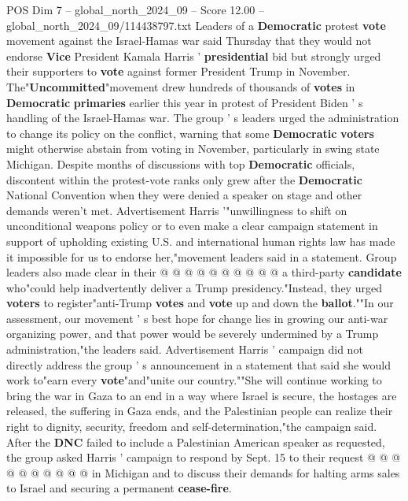 \begin{textsample}{POS Dim 7 – global\_north\_2024\_09 – Score 12.00 – global\_north\_2024\_09/114438797.txt}  \label{ex:f7_pos_078}
Leaders of a \textbf{Democratic} protest \textbf{vote} movement against the Israel-Hamas war said Thursday that they would not endorse \textbf{Vice} President Kamala Harris ' \textbf{presidential} bid but strongly urged their supporters to \textbf{vote} against former President Trump in November.
The"\textbf{Uncommitted}"movement drew hundreds of thousands of \textbf{votes} in \textbf{Democratic} \textbf{primaries} earlier this year in protest of President Biden ' s handling of the Israel-Hamas war.
The group ' s leaders urged the administration to change its policy on the conflict, warning that some \textbf{Democratic} \textbf{voters} might otherwise abstain from voting in November, particularly in swing state Michigan.
Despite months of discussions with top \textbf{Democratic} officials, discontent within the protest-vote ranks only grew after the \textbf{Democratic} National Convention when they were denied a speaker on stage and other demands weren't met.
Advertisement Harris '"unwillingness to shift on unconditional weapons policy or to even make a clear campaign statement in support of upholding existing U.S. and international human rights law has made it impossible for us to endorse her,"movement leaders said in a statement.
Group leaders also made clear in their @ @ @ @ @ @ @ @ @ @ a third-party \textbf{candidate} who"could help inadvertently deliver a Trump presidency."Instead, they urged \textbf{voters} to register"anti-Trump \textbf{votes} and \textbf{vote} up and down the \textbf{ballot}.""In our assessment, our movement ' s best hope for change lies in growing our anti-war organizing power, and that power would be severely undermined by a Trump administration,"the leaders said.
Advertisement Harris ' campaign did not directly address the group ' s announcement in a statement that said she would work to"earn every \textbf{vote}"and"unite our country.""She will continue working to bring the war in Gaza to an end in a way where Israel is secure, the hostages are released, the suffering in Gaza ends, and the Palestinian people can realize their right to dignity, security, freedom and self-determination,"the campaign said.
After the \textbf{DNC} failed to include a Palestinian American speaker as requested, the group asked Harris ' campaign to respond by Sept. 15 to their request @ @ @ @ @ @ @ @ @ @ in Michigan and to discuss their demands for halting arms sales to Israel and securing a permanent \textbf{cease-fire}.

\end{textsample}
